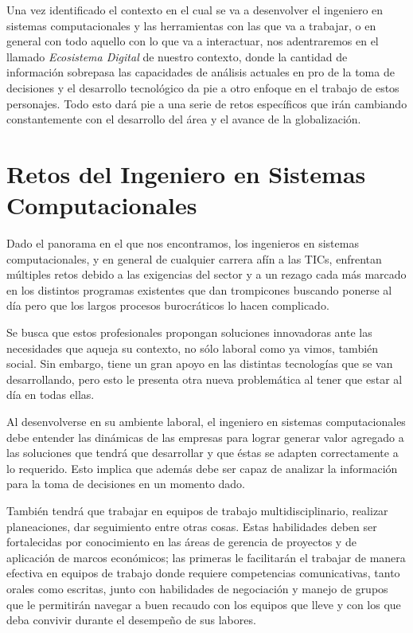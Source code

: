 \noindent Una vez identificado el contexto en el cual se va a desenvolver el ingeniero en sistemas computacionales y las herramientas con las que va a trabajar, o en general con todo aquello con lo que va a interactuar, nos adentraremos en el llamado \textit{Ecosistema Digital} de nuestro contexto, donde la cantidad de información sobrepasa las capacidades de análisis actuales en pro de la toma de decisiones y el desarrollo tecnológico da pie a otro enfoque en el trabajo de estos personajes. Todo esto dará pie a una serie de retos específicos que irán cambiando constantemente con el desarrollo del área y el avance de la globalización.



\section{Retos del Ingeniero en Sistemas Computacionales}

Dado el panorama en el que nos encontramos, los ingenieros en sistemas computacionales, y en general de cualquier carrera afín a las TICs, enfrentan múltiples retos debido a las exigencias del sector y a un rezago cada más marcado en los distintos programas existentes que dan trompicones buscando ponerse al día pero que los largos procesos burocráticos lo hacen complicado.
\vspace{5mm}

\noindent Se busca que estos profesionales propongan soluciones innovadoras ante las necesidades que aqueja su contexto, no sólo laboral como ya vimos, también social. Sin embargo, tiene un gran apoyo en las distintas tecnologías que se van desarrollando, pero esto le presenta otra nueva problemática al tener que estar al día en todas ellas.
\vspace{5mm}

\noindent Al desenvolverse en su ambiente laboral, el ingeniero en sistemas computacionales debe entender las dinámicas de las empresas para lograr generar valor agregado a las soluciones que tendrá que desarrollar y que éstas se adapten correctamente a lo requerido. Esto implica que además debe ser capaz de analizar la información para la toma de decisiones en un momento dado.
\vspace{5mm}

\noindent También tendrá que trabajar en equipos de trabajo multidisciplinario, realizar planeaciones, dar seguimiento entre otras cosas. Estas habilidades deben ser fortalecidas por conocimiento en las áreas de gerencia de proyectos y de aplicación de marcos económicos; las primeras le facilitarán el trabajar de manera efectiva en equipos de trabajo donde requiere competencias comunicativas, tanto orales como escritas, junto con habilidades de negociación y manejo de grupos que le permitirán navegar a buen recaudo con los equipos que lleve y con los que deba convivir durante el desempeño de sus labores.
\vspace{5mm}

